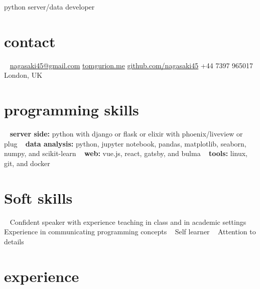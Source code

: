\documentclass[]{friggeri-cv}
\begin{document}
       {python server/data developer}



\begin{aside}
\section{contact}
~
\href{mailto:nagasaki45@gmail.com}{nagasaki45@gmail.com}
\href{http://tomgurion.me}{tomgurion.me}
\href{https://github.com/nagasaki45}{github.com/nagasaki45}
+44 7397 965017
London, UK
~
\section{programming skills}
~
\textbf{server side:} python with django or flask or elixir with phoenix/liveview or plug
~
\textbf{data analysis:} python, jupyter notebook, pandas, matplotlib, seaborn, numpy, and scikit-learn
~
\textbf{web:} vue.js, react, gatsby, and bulma
~
\textbf{tools:} linux, git, and docker
~
\section{Soft skills}
~
Confident speaker with experience teaching in class and in academic settings
~
Experience in communicating programming concepts
~
Self learner
~
Attention to details
\end{aside}



\section{experience}
\end{document}
